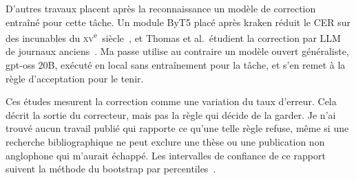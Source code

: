 D'autres travaux placent après la reconnaissance un modèle de correction
entraîné pour cette tâche. Un module ByT5 placé après kraken réduit le CER sur
des incunables du \textsc{xv}\textsuperscript{e}~siècle~\cite{momtaz2025modular},
et Thomas et al.\ étudient la correction par LLM de journaux
anciens~\cite{thomas2024leveraging}. Ma passe utilise au contraire un modèle
ouvert généraliste, gpt-oss 20B, exécuté en local sans entraînement pour la
tâche, et s'en remet à la règle d'acceptation pour le tenir.

Ces études mesurent la correction comme une variation du taux d'erreur. Cela
décrit la sortie du correcteur, mais pas la règle qui décide de la garder. Je
n'ai trouvé aucun travail publié qui rapporte ce qu'une telle règle refuse,
même si une recherche bibliographique ne peut exclure une thèse ou une
publication non anglophone qui m'aurait échappé. Les intervalles de confiance
de ce rapport suivent la méthode du bootstrap par
percentiles~\cite{efron1994bootstrap}.
